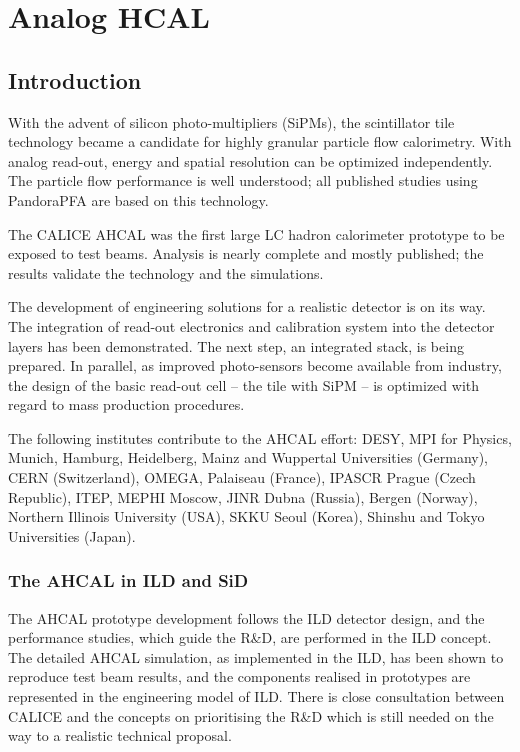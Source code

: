 \section{Analog HCAL}
\subsection{Introduction}
With the advent of silicon photo-multipliers (SiPMs), the scintillator tile technology became a candidate for highly granular particle flow calorimetry. With analog read-out, energy and spatial resolution can be optimized independently. The particle flow performance is well understood; all published studies using PandoraPFA are based on this technology.

The CALICE AHCAL was the first large LC hadron calorimeter prototype to be exposed to test beams. Analysis is nearly complete and mostly published; the results validate the technology and the simulations.

The development of engineering solutions for a realistic detector is on its way. The integration of read-out electronics and calibration system into the detector layers has been demonstrated. The next step, an integrated stack, is being prepared. In parallel, as improved photo-sensors become available from industry, the design of the basic read-out cell -- the tile with SiPM -- is optimized with regard to mass production procedures.

The following institutes contribute to the AHCAL effort:
DESY, MPI for Physics, Munich, Hamburg, Heidelberg, Mainz and Wuppertal Universities (Germany), CERN (Switzerland), OMEGA, Palaiseau (France), IPASCR Prague (Czech Republic), ITEP, MEPHI Moscow, JINR Dubna (Russia), Bergen (Norway), Northern Illinois University (USA), SKKU Seoul (Korea), Shinshu and Tokyo Universities (Japan).

\subsubsection{The AHCAL in ILD and SiD}
The AHCAL prototype development follows the ILD detector design, and the performance studies, which guide the R\&D, are performed in the ILD concept. The detailed AHCAL simulation, as implemented in the ILD, has been shown to reproduce test beam results, and the components realised in prototypes are represented in the engineering model of ILD. There is close consultation between CALICE and the concepts on prioritising the R\&D which is still needed on the way to a realistic technical proposal. 

